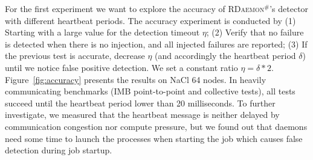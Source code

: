 \documentclass[sigconf]{acmart}
\newcommand{\ourwork}[0]{\textsc{RDaemon}\ensuremath{^\#}\xspace}
\newcommand{\imb}[0]{\textsc{IMB}\xspace}
\begin{document}
For the first experiment we want to explore the accuracy of \ourwork's detector with different heartbeat periods.
%
The accuracy experiment is conducted by (1) Starting with a large value for the
detection timeout $\eta$; (2) Verify that no failure is detected when there is no injection, and all injected failures are reported; (3) If the previous test is accurate, decrease $\eta$ (and accordingly the heartbeat period $\delta$) until we notice false positive detection. We set a constant ratio $\eta = \delta * 2$.
 Figure~\ref{fig:accuracy} presents the results on NaCl 64 nodes.
 In heavily communicating benchmarks
 (\imb point-to-point and collective tests), all tests succeed until the
  heartbeat period lower than 20 milliseconds. To further investigate,
  we measured that the heartbeat message is neither delayed by communication
  congestion nor compute pressure, but we found out that daemons need some time to launch the processes when starting the job which causes false detection during job startup.
  

\end{document}
